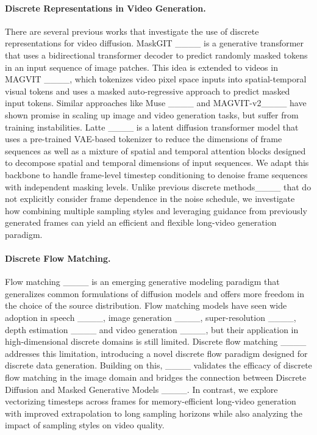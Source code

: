\paragraph{Discrete Representations in Video Generation.}
There are several previous works that investigate the use of discrete representations for video diffusion. MaskGIT ____ is a generative transformer that uses a bidirectional transformer decoder to predict randomly masked tokens in an input sequence of image patches. This idea is extended to videos in MAGVIT ____, which tokenizes video pixel space inputs into spatial-temporal visual tokens and uses a masked auto-regressive approach to predict masked input tokens. Similar approaches like Muse ____ and MAGVIT-v2____ have shown promise in scaling up image and video generation tasks, but suffer from training instabilities. Latte ____ is a latent diffusion transformer model that uses a pre-trained VAE-based tokenizer to reduce the dimensions of frame sequences as well as a mixture of spatial and temporal attention blocks designed to decompose spatial and temporal dimensions of input sequences. We adapt this backbone to handle frame-level timestep conditioning to denoise frame sequences with independent masking levels. Unlike previous discrete methods____ that do not explicitly consider frame dependence in the noise schedule, we investigate how combining multiple sampling styles and leveraging guidance from previously generated frames can yield an efficient and flexible long-video generation paradigm.

\paragraph{Discrete Flow Matching.}
Flow matching ____ is an emerging generative modeling paradigm that generalizes common formulations of diffusion models and offers more freedom in the choice of the source distribution. Flow matching models have seen wide adoption in speech ____, image generation ____, super-resolution ____, depth estimation ____ and video generation ____, but their application in high-dimensional discrete domains is still limited. Discrete flow matching ____ addresses this limitation, introducing a novel discrete flow paradigm designed for discrete data generation. Building on this, ____ validates the efficacy of discrete flow matching in the image domain and bridges the connection between Discrete Diffusion and Masked Generative Models ____. %
In contrast, we explore vectorizing timesteps across frames for memory-efficient long-video generation with improved extrapolation to long sampling horizons while also analyzing the impact of sampling styles on video quality.